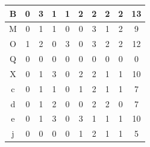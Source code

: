 \documentclass[11pt,dvipdfmx]{jreport}
\begin{document}
\begin{table}[h]
\begin{minipage}[t]{0.55\linewidth}
\begin{tabular}{c|c|cccccccc}
B                   & 0                                           & \multicolumn{1}{c|}{3} & \multicolumn{1}{c|}{1} & \multicolumn{1}{c|}{1} & \multicolumn{1}{c|}{2} & \multicolumn{1}{c|}{2} & \multicolumn{1}{c|}{2} & \multicolumn{1}{c|}{2} & 13  \\ \hline
M                   & 0                                           & \multicolumn{1}{c|}{1} & \multicolumn{1}{c|}{1} & \multicolumn{1}{c|}{0} & \multicolumn{1}{c|}{0} & \multicolumn{1}{c|}{3} & \multicolumn{1}{c|}{1} & \multicolumn{1}{c|}{2} & 9  \\ \hline
O                   & 1                                           & \multicolumn{1}{c|}{2} & \multicolumn{1}{c|}{0} & \multicolumn{1}{c|}{3} & \multicolumn{1}{c|}{0} & \multicolumn{1}{c|}{3} & \multicolumn{1}{c|}{2} & \multicolumn{1}{c|}{2} & 12  \\ \hline
Q                   & 0                                           & \multicolumn{1}{c|}{0} & \multicolumn{1}{c|}{0} & \multicolumn{1}{c|}{0} & \multicolumn{1}{c|}{0} & \multicolumn{1}{c|}{0} & \multicolumn{1}{c|}{0} & \multicolumn{1}{c|}{0} & 0  \\ \hline
X                   & 0                                           & \multicolumn{1}{c|}{1} & \multicolumn{1}{c|}{3} & \multicolumn{1}{c|}{0} & \multicolumn{1}{c|}{2} & \multicolumn{1}{c|}{2} & \multicolumn{1}{c|}{1} & \multicolumn{1}{c|}{1} & 10  \\ \hline
c                   & 0                                           & \multicolumn{1}{c|}{1} & \multicolumn{1}{c|}{1} & \multicolumn{1}{c|}{0} & \multicolumn{1}{c|}{1} & \multicolumn{1}{c|}{2} & \multicolumn{1}{c|}{1} & \multicolumn{1}{c|}{1} & 7  \\ \hline
d                   & 0                                           & \multicolumn{1}{c|}{1} & \multicolumn{1}{c|}{2} & \multicolumn{1}{c|}{0} & \multicolumn{1}{c|}{0} & \multicolumn{1}{c|}{2} & \multicolumn{1}{c|}{2} & \multicolumn{1}{c|}{0} & 7  \\ \hline
e                   & 0                                           & \multicolumn{1}{c|}{1} & \multicolumn{1}{c|}{3} & \multicolumn{1}{c|}{0} & \multicolumn{1}{c|}{3} & \multicolumn{1}{c|}{1} & \multicolumn{1}{c|}{1} & \multicolumn{1}{c|}{1} & 10  \\ \hline
j                   & 0                                           & \multicolumn{1}{c|}{0} & \multicolumn{1}{c|}{0} & \multicolumn{1}{c|}{0} & \multicolumn{1}{c|}{1} & \multicolumn{1}{c|}{2} & \multicolumn{1}{c|}{1} & \multicolumn{1}{c|}{1} & 5  \\ \hline

\end{tabular}
\end{minipage}
\end{table}
\end{document}
